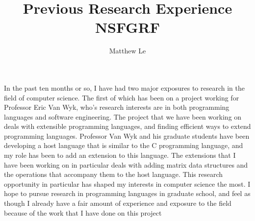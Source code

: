 \documentclass[a4paper,12pt]{article}
\title{Previous Research Experience NSFGRF}
\author{Matthew Le}
\begin{document}
\maketitle
In the past ten months or so, I have had two major exposures to research in the field of computer science.  The first of which has been on a project working for Professor Eric Van Wyk, who's research interests are in both programming languages and software engineering.  The project that we have been working on deals with extensible programming languages, and finding efficient ways to extend programming languages.  Professor Van Wyk and his graduate students have been developing a host language that is similar to the C programming language, and my role has been to add an extension to this language.  The extensions that I have been working on in particular deals with adding matrix data structures and the operations that accompany them to the host language.  This research opportunity in particular has shaped my interests in computer science the most.  I hope to pursue research in programming languages in graduate school, and feel as though I already have a fair amount of experience and exposure to the field  because of the work that I have done on this project
\end{document}
